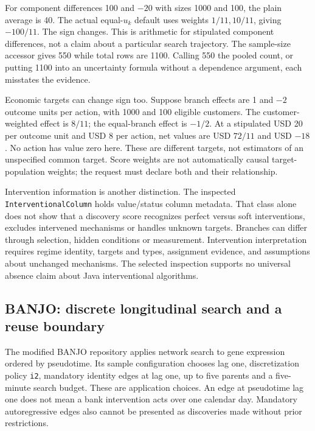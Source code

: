 For component differences 100 and $-20$ with sizes 1000 and 100, the plain
average is 40. The actual equal-$u_k$ default uses weights $1/11,10/11$, giving
$-100/11$. The sign changes. This is arithmetic for stipulated component
differences, not a claim about a particular search trajectory. The sample-size
accessor gives 550 while total rows are 1100. Calling 550 the pooled count, or
putting 1100 into an uncertainty formula without a dependence argument, each
misstates the evidence.~\citep{exec15_javatemporal_exact}

Economic targets can change sign too. Suppose branch effects are 1 and $-2$
outcome units per action, with 1000 and 100 eligible customers. The
customer-weighted effect is $8/11$; the equal-branch effect is $-1/2$. At a
stipulated USD 20 per outcome unit and USD 8 per action, net values are
USD $72/11$ and USD $-18$. No action has value zero here. These are different
targets, not estimators of an unspecified common target. Score weights are
not automatically causal target-population weights; the request must declare
both and their relationship.~\citep{exec15_javatemporal_exact}

Intervention information is another distinction. The inspected
\texttt{InterventionalColumn} holds value/status column metadata. That class
alone does not show that a discovery score recognizes perfect versus soft
interventions, excludes intervened mechanisms or handles unknown targets.
Branches can differ through selection, hidden conditions or measurement.
Intervention interpretation requires regime identity, targets and types,
assignment evidence, and assumptions about unchanged mechanisms. The selected
inspection supports no universal absence claim about Java interventional
algorithms.~\citep{exec15_javatemporal_tetrad,exec15_javatemporal_design}

\subsection{BANJO: discrete longitudinal search and a reuse boundary}

The modified BANJO repository applies network search to gene expression
ordered by pseudotime. Its sample configuration chooses lag one,
discretization policy \texttt{i2}, mandatory identity edges at lag one, up to
five parents and a five-minute search budget. These are application choices.
An edge at pseudotime lag one does not mean a bank intervention acts over one
calendar day. Mandatory autoregressive edges also cannot be presented as
discoveries made without prior restrictions.~\citep{exec15_javatemporal_banjo}


